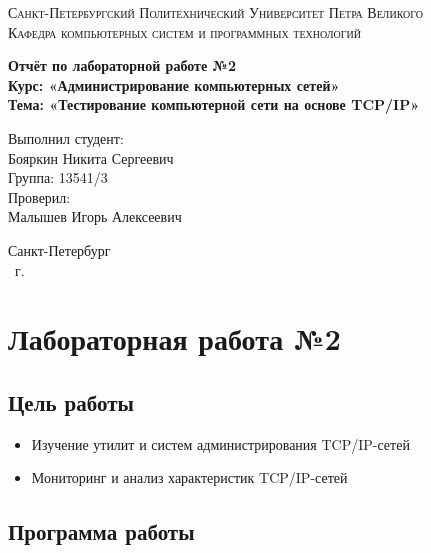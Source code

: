\documentclass[14pt,a4paper,report]{report}
\begin{document}
\def\contentsname{Содержание}

\begin{titlepage}
	\begin{center}
		\textsc{Санкт-Петербургский Политехнический 
			Университет Петра Великого\\[5mm]
			Кафедра компьютерных систем и программных технологий}
		
		\vfill
		
		\textbf{Отчёт по лабораторной работе №2\\[3mm]
			Курс: «Администрирование компьютерных сетей»\\[3mm]
			Тема: «Тестирование компьютерной сети на основе TCP/IP»\\[35mm]
			}
	\end{center}
	
	\hfill
	\begin{minipage}{.5\textwidth}
		Выполнил студент:\\[2mm] 
		Бояркин Никита Сергеевич\\
		Группа: 13541/3\\[5mm]
		
		Проверил:\\[2mm] 
		Малышев Игорь Алексеевич
	\end{minipage}
	\vfill
	\begin{center}
		Санкт-Петербург\\ \the\year\ г.
	\end{center}
\end{titlepage}

\tableofcontents
\clearpage

\chapter{Лабораторная работа №2}

\section{Цель работы}

\begin{itemize}
	\item Изучение утилит и систем администрирования TCP/IP-сетей
	\item Мониторинг и анализ характеристик TCP/IP-сетей
\end{itemize}

\section{Программа работы}
\end{document}
